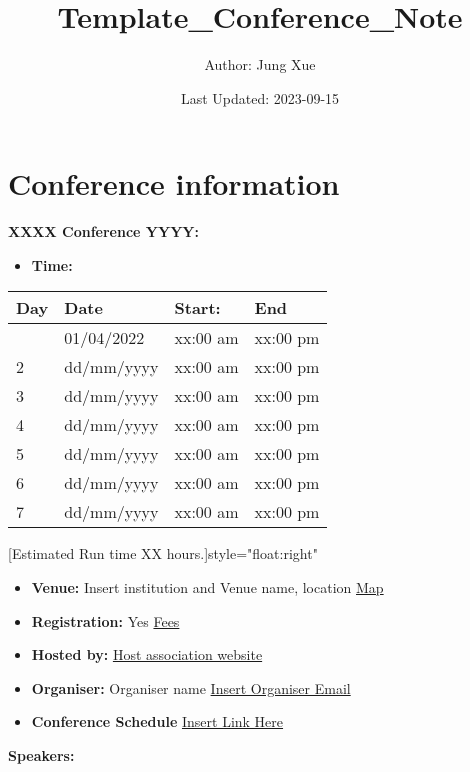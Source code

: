 \documentclass[
]{book}
\title{Template\_Conference\_Note}
\author{Author: Jung Xue}
\date{Last Updated: 2023-09-15}
\providecommand{\tightlist}{%
  \setlength{\itemsep}{0pt}\setlength{\parskip}{0pt}}
\begin{document}
\maketitle

{
\setcounter{tocdepth}{1}
\tableofcontents
}
\hypertarget{conference-information}{%
\chapter*{Conference information}\label{conference-information}}

\textbf{XXXX Conference YYYY:}

\begin{itemize}
\tightlist
\item
  \textbf{Time:}
\end{itemize}

\begin{longtable}[]{@{}llll@{}}
\toprule\noalign{}
Day & Date & Start: & End \\
\midrule\noalign{}
\endhead
\bottomrule\noalign{}
\endlastfoot
1 & 01/04/2022 & xx:00 am & xx:00 pm \\
2 & dd/mm/yyyy & xx:00 am & xx:00 pm \\
3 & dd/mm/yyyy & xx:00 am & xx:00 pm \\
4 & dd/mm/yyyy & xx:00 am & xx:00 pm \\
5 & dd/mm/yyyy & xx:00 am & xx:00 pm \\
6 & dd/mm/yyyy & xx:00 am & xx:00 pm \\
7 & dd/mm/yyyy & xx:00 am & xx:00 pm \\
\end{longtable}

\hfill[Estimated Run time XX hours.]{style="float:right"}

\begin{itemize}
\tightlist
\item
  \textbf{Venue:} Insert institution and Venue name, location \href{}{Map}
\item
  \textbf{Registration:} Yes \href{}{Fees}
\item
  \textbf{Hosted by:} \href{}{Host association website}
\item
  \textbf{Organiser:} Organiser name \href{}{Insert Organiser Email}
\item
  \textbf{Conference Schedule} \href{}{Insert Link Here}
\end{itemize}

\textbf{Speakers:}
\end{document}
